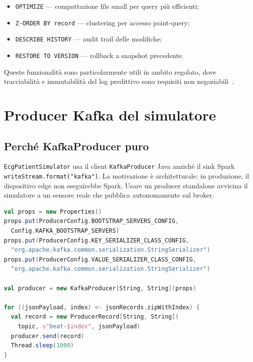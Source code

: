 \begin{itemize}
  \item \texttt{OPTIMIZE} --- compattazione file small per query più efficienti;
  \item \texttt{Z-ORDER BY record} --- clustering per accesso point-query;
  \item \texttt{DESCRIBE HISTORY} --- audit trail delle modifiche;
  \item \texttt{RESTORE TO VERSION} --- rollback a snapshot precedente.
\end{itemize}

Queste funzionalità sono particolarmente utili in ambito regolato, dove tracciabilità e immutabilità del log predittivo sono requisiti non negoziabili~\cite{armbrust2020delta}.

\section{Producer Kafka del simulatore}\label{sec:producer-kafka}

\subsection{Perché KafkaProducer puro}

\texttt{EcgPatientSimulator} usa il client \texttt{KafkaProducer} Java anziché il sink Spark \texttt{writeStream.format("kafka")}.
La motivazione è architetturale: in produzione, il dispositivo edge non eseguirebbe Spark.
Usare un producer standalone avvicina il simulatore a un sensore reale che pubblica autonomamente sul broker.

\begin{lstlisting}[language=Scala,caption={Configurazione e invio messaggi Kafka.},label={lst:kafka-producer}]
val props = new Properties()
props.put(ProducerConfig.BOOTSTRAP_SERVERS_CONFIG,
  Config.KAFKA_BOOTSTRAP_SERVERS)
props.put(ProducerConfig.KEY_SERIALIZER_CLASS_CONFIG,
  "org.apache.kafka.common.serialization.StringSerializer")
props.put(ProducerConfig.VALUE_SERIALIZER_CLASS_CONFIG,
  "org.apache.kafka.common.serialization.StringSerializer")

val producer = new KafkaProducer[String, String](props)

for ((jsonPayload, index) <- jsonRecords.zipWithIndex) {
  val record = new ProducerRecord[String, String](
    topic, s"beat-$index", jsonPayload)
  producer.send(record)
  Thread.sleep(1000)
}
\end{lstlisting}

